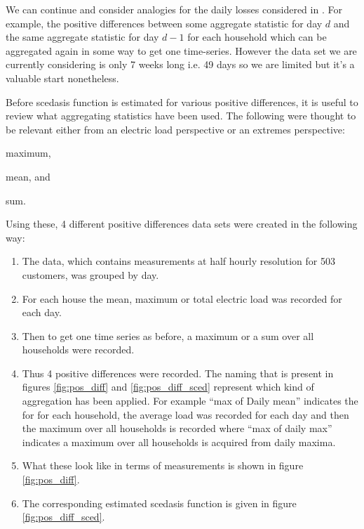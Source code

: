 

We can continue and consider analogies for the daily losses considered in \cite{einmahl16}. For example, the positive differences between some aggregate statistic for day $d$ and the same aggregate statistic for day $d-1$ for each household which can be aggregated again in some way to get one time-series. However the data set we are currently considering is only 7 weeks long i.e. 49 days so we are limited but it's a valuable start nonetheless.

Before scedasis function is estimated for various positive differences, it is useful to review what aggregating statistics have been used. The following were thought to be relevant either from an electric load perspective or an extremes perspective: \begin{enumerate*}[label=\roman*)] \item maximum, \item mean, and \item sum. \end{enumerate*} Using these, 4 different positive differences data sets were created in the following way:
\begin{enumerate}
\item The data, which contains measurements at half hourly resolution for 503 customers, was grouped by day.
\item For each house the mean, maximum or total electric load was recorded for each day.
\item Then to get one time series as before, a maximum or a sum over all households were recorded.
\item Thus 4 positive differences were recorded. The naming that is present in figures \ref{fig:pos_diff} and \ref{fig:pos_diff_sced} represent which kind of aggregation has been applied. For example ``max of Daily mean'' indicates the for for each household, the average load was recorded for each day and then the maximum  over all households is recorded where ``max of daily max'' indicates a maximum over all households is acquired from daily maxima.
\item What these look like in terms of measurements is shown in figure \ref{fig:pos_diff}.
\item The corresponding estimated scedasis function is given in figure \ref{fig:pos_diff_sced}.
\end{enumerate}

